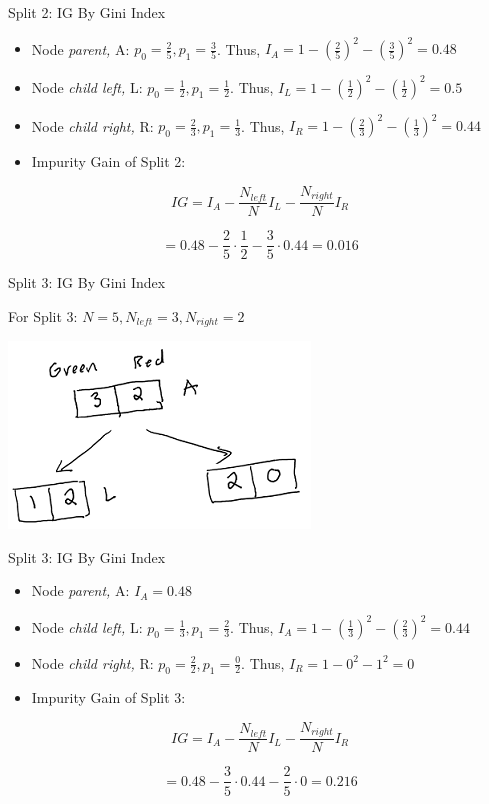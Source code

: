 \documentclass[
  ignorenonframetext,
]{beamer}
\begin{document}
\begin{frame}{Split 2: IG By Gini Index}
\protect\hypertarget{split-2-ig-by-gini-index-1}{}

\begin{itemize}
\item
  Node \emph{parent,} A: \(p_0 = \frac{2}{5}, p_1 = \frac{3}{5}\). Thus,
  \(I_{A} = 1-(\frac{2}{5})^2- (\frac{3}{5})^2 = 0.48\)
\item
  Node \emph{child left,} L: \(p_0 = \frac{1}{2}, p_1 = \frac{1}{2}\).
  Thus, \(I_{L} = 1- (\frac{1}{2})^2-(\frac{1}{2})^2=0.5\)
\item
  Node \emph{child right,} R: \(p_0 = \frac{2}{3}, p_1 = \frac{1}{3}\).
  Thus, \(I_{R} = 1-(\frac{2}{3})^2 -(\frac{1}{3})^2 = 0.44\)
\item
  Impurity Gain of Split 2:
\end{itemize}

\[
IG = I_{A} - \frac{N_{left}}{N}I_{L}-\frac{N_{right}}{N}I_{R}
\]

\[ = 0.48 - \frac{2}{5} \cdot \frac{1}{2}-\frac{3}{5} \cdot 0.44 = 0.016\]

\end{frame}

\begin{frame}{Split 3: IG By Gini Index}
\protect\hypertarget{split-3-ig-by-gini-index}{}

For Split 3: \(N = 5, N_{left} =3, N_{right} = 2\)

\includegraphics{images2/im2.png}

\end{frame}

\begin{frame}{Split 3: IG By Gini Index}
\protect\hypertarget{split-3-ig-by-gini-index-1}{}

\begin{itemize}
\item
  Node \emph{parent,} A: \(I_{A} = 0.48\)
\item
  Node \emph{child left,} L: \(p_0 = \frac{1}{3}, p_1 = \frac{2}{3}\).
  Thus, \(I_{A} = 1-(\frac{1}{3})^2 -(\frac{2}{3})^2 = 0.44\)
\item
  Node \emph{child right,} R: \(p_0 = \frac{2}{2}, p_1 = \frac{0}{2}\).
  Thus, \(I_{R} = 1-0^2-1^2 = 0\)
\item
  Impurity Gain of Split 3:
\end{itemize}

\[
IG = I_{A} - \frac{N_{left}}{N}I_{L}-\frac{N_{right}}{N}I_{R}
\]

\[ = 0.48 - \frac{3}{5} \cdot 0.44 - \frac{2}{5} \cdot 0 = 0.216\]

\end{frame}
\end{document}
